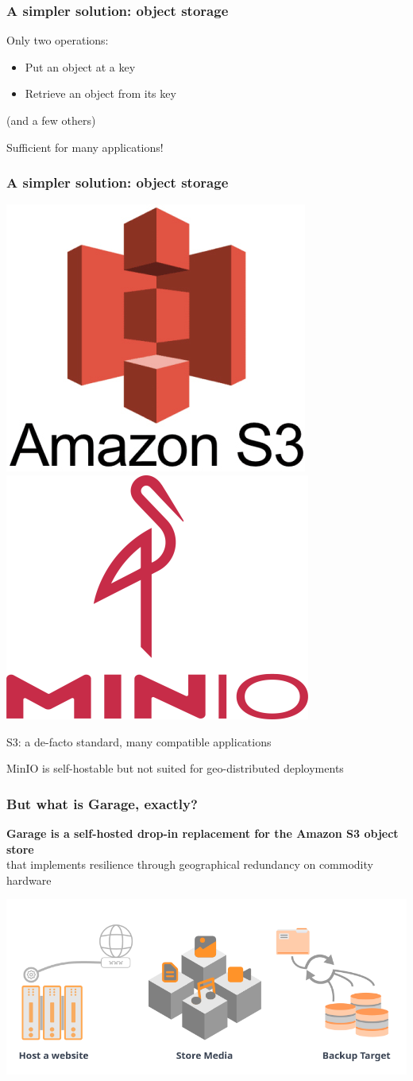 \documentclass[aspectratio=169]{beamer}
\begin{document}
\begin{frame}
	\frametitle{A simpler solution: object storage}
	Only two operations:
	\vspace{1em}
	\begin{itemize}
		\item Put an object at a key
			\vspace{1em}
		\item Retrieve an object from its key
	\end{itemize}
	\vspace{1em}
	{\footnotesize (and a few others)}

	\vspace{1em}
	Sufficient for many applications!
\end{frame}

\begin{frame}
	\frametitle{A simpler solution: object storage}
		\begin{center}
			\includegraphics[width=.2\linewidth]{../2020-12-02_wide-team/img/Amazon-S3.jpg}
			\hspace{5em}
			\includegraphics[width=.2\linewidth]{assets/minio.png}
		\end{center}
		\vspace{1em}
	S3: a de-facto standard, many compatible applications

	\vspace{1em}

	MinIO is self-hostable but not suited for geo-distributed deployments
\end{frame}


\begin{frame}
	\frametitle{But what is Garage, exactly?}
	\textbf{Garage is a self-hosted drop-in replacement for the Amazon S3 object store}\\
	\vspace{.5em}
	that implements resilience through geographical redundancy on commodity hardware
		\begin{center}
			\includegraphics[width=.8\linewidth]{assets/garageuses.png}
		\end{center}
\end{frame}
\end{document}
